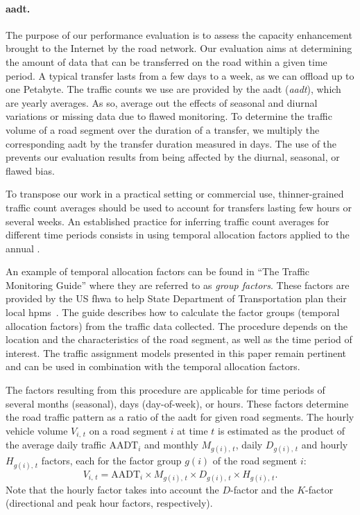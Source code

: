 \paragraph{\acrfull{aadt}.}
The purpose of our performance evaluation is to assess the capacity enhancement brought to the Internet by the road network. Our evaluation aims at determining the amount of data that can be transferred on the road within a given time period. A typical transfer lasts from a few days to a week, as we can offload up to one Petabyte. The traffic counts we use are provided by the \acrshort{aadt} (\textit{\acrfull{aadt}}), which are yearly averages. As so,  average out the effects of seasonal and diurnal variations or missing data due to flawed monitoring. To determine the traffic volume of a road segment over the duration of a transfer, we multiply the corresponding \acrshort{aadt} by the transfer duration measured in days. The use of the  prevents our evaluation results from being affected by the diurnal, seasonal, or flawed bias. 

To transpose our work in a practical setting or commercial use, thinner-grained traffic count averages should be used to account for transfers lasting few hours or several weeks. An established practice for inferring traffic count averages for different time periods consists in using temporal allocation factors applied to the annual . 

An example of temporal allocation factors can be found in ``The Traffic Monitoring Guide'' where they are referred to as \textit{group factors}. These factors are provided by the US \acrfull{fhwa} to help State Department of Transportation plan their local \acrfull{hpms}~\cite{wright1997variability,guide2013us}. The guide describes how to calculate the factor groups (\ie temporal allocation factors) from the traffic data collected. The procedure depends on the location and the characteristics of the road segment, as well as the time period of interest. The traffic assignment models presented in this paper remain pertinent and can be used in combination with the temporal allocation factors.

The factors resulting from this procedure are applicable for time periods of several months (seasonal), days (day-of-week), or hours. These factors determine the road traffic pattern as a ratio of the \acrshort{aadt} for given road segments. The hourly vehicle volume $V_{i,\,t}$ on a road segment $i$ at time $t$ is estimated as the product of the average daily traffic $\textrm{AADT}_{i}$ and monthly $M_{g(i),\,t}$, daily $D_{g(i),\,t}$ and hourly $H_{g(i),\,t}$ factors, each for the factor group $g(i)$ of the road segment $i$:
\begin{equation}
    \label{eq:traffic-variation}
    V_{i,\,t} = \textrm{AADT}_{i} \times M_{g(i),\,t} \times D_{g(i),\,t} \times H_{g(i),\,t}.
\end{equation}
Note that the hourly factor takes into account the $D$-factor and the $K$-factor (directional and peak hour factors, respectively).

